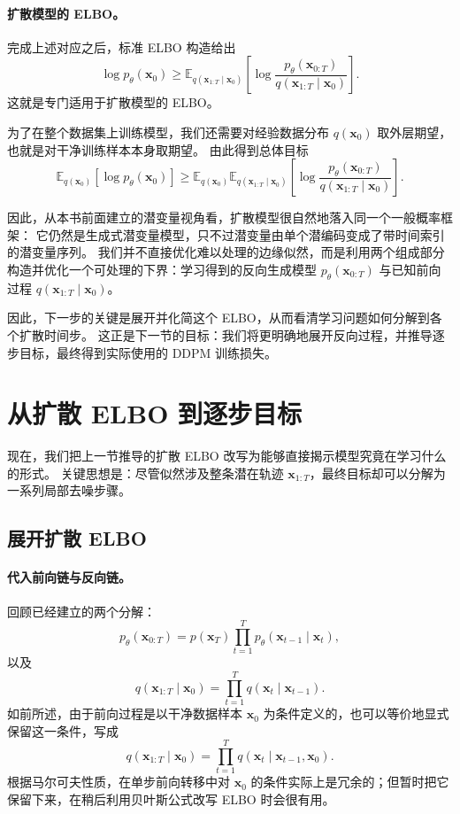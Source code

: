 \paragraph{扩散模型的 ELBO。}
完成上述对应之后，标准 ELBO 构造给出
\[
\log p_\theta(\mathbf{x}_0)
\ge
\mathbb{E}_{q(\mathbf{x}_{1:T}\mid \mathbf{x}_0)}
\!\left[
\log
\frac{
p_\theta(\mathbf{x}_{0:T})
}{
q(\mathbf{x}_{1:T}\mid \mathbf{x}_0)
}
\right].
\]
这就是专门适用于扩散模型的 ELBO。

为了在整个数据集上训练模型，我们还需要对经验数据分布 $q(\mathbf{x}_0)$ 取外层期望，也就是对干净训练样本本身取期望。
由此得到总体目标
\[
\mathbb{E}_{q(\mathbf{x}_0)}
\left[
\log p_\theta(\mathbf{x}_0)
\right]
\ge
\mathbb{E}_{q(\mathbf{x}_0)}
\mathbb{E}_{q(\mathbf{x}_{1:T}\mid \mathbf{x}_0)}
\!\left[
\log
\frac{
p_\theta(\mathbf{x}_{0:T})
}{
q(\mathbf{x}_{1:T}\mid \mathbf{x}_0)
}
\right].
\]

因此，从本书前面建立的潜变量视角看，扩散模型很自然地落入同一个一般概率框架：
它仍然是生成式潜变量模型，只不过潜变量由单个潜编码变成了带时间索引的潜变量序列。
我们并不直接优化难以处理的边缘似然，而是利用两个组成部分构造并优化一个可处理的下界：学习得到的反向生成模型
$p_\theta(\mathbf{x}_{0:T})$ 与已知前向过程
$q(\mathbf{x}_{1:T}\mid \mathbf{x}_0)$。

因此，下一步的关键是展开并化简这个 ELBO，从而看清学习问题如何分解到各个扩散时间步。
这正是下一节的目标：我们将更明确地展开反向过程，并推导逐步目标，最终得到实际使用的 DDPM 训练损失。

\section{从扩散 ELBO 到逐步目标}

现在，我们把上一节推导的扩散 ELBO 改写为能够直接揭示模型究竟在学习什么的形式。
关键思想是：尽管似然涉及整条潜在轨迹 $\mathbf{x}_{1:T}$，最终目标却可以分解为一系列局部去噪步骤。

\subsection{展开扩散 ELBO}

\paragraph{代入前向链与反向链。}

回顾已经建立的两个分解：
\[
p_\theta(\mathbf{x}_{0:T})
=
p(\mathbf{x}_T)\prod_{t=1}^{T} p_\theta(\mathbf{x}_{t-1}\mid \mathbf{x}_t),
\]
以及
\[
q(\mathbf{x}_{1:T}\mid \mathbf{x}_0)
=
\prod_{t=1}^{T} q(\mathbf{x}_t\mid \mathbf{x}_{t-1}).
\]
如前所述，由于前向过程是以干净数据样本 $\mathbf{x}_0$ 为条件定义的，也可以等价地显式保留这一条件，写成
\[
q(\mathbf{x}_{1:T}\mid \mathbf{x}_0)
=
\prod_{t=1}^{T} q(\mathbf{x}_t\mid \mathbf{x}_{t-1},\mathbf{x}_0).
\]
根据马尔可夫性质，在单步前向转移中对 $\mathbf{x}_0$ 的条件实际上是冗余的；但暂时把它保留下来，在稍后利用贝叶斯公式改写 ELBO 时会很有用。

